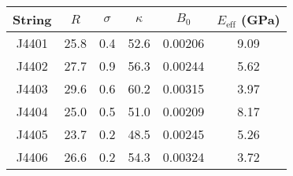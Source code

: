 \begin{tabular}{cccccc}
\toprule
String & $R$ & $\sigma$ & $\kappa$ & $B_0$ & $E_\mathrm{eff}$ (GPa) \\
\midrule
J4401 & 25.8 & 0.4 & 52.6 & 0.00206 & 9.09 \\
J4402 & 27.7 & 0.9 & 56.3 & 0.00244 & 5.62 \\
J4403 & 29.6 & 0.6 & 60.2 & 0.00315 & 3.97 \\
J4404 & 25.0 & 0.5 & 51.0 & 0.00209 & 8.17 \\
J4405 & 23.7 & 0.2 & 48.5 & 0.00245 & 5.26 \\
J4406 & 26.6 & 0.2 & 54.3 & 0.00324 & 3.72 \\
\bottomrule
\end{tabular}
